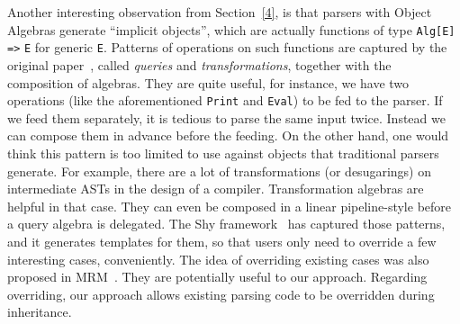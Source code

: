 \begin{comment}
Moreover, in~\cite{Oliveira:2012} the authors have discussed the
composition of algebras. In our parsing approach, a parser consumes an
algebra, which is delegated to return the results, during its process
of parsing. Having a set of algebras, it requires multiple parsing
with several times of invocation, which leads to redundant work.
Instead, algebras are supposed to be composed into one before the
invocation of the parser. Bahr et al. lead a similar discussion
in~\cite{Bahr2011}, where queries (or \textit{catamorphisms}) and
transformations (or \textit{homomorphisms}) are composable. They have
also mentioned the dual process of folds, namely
\textit{anamorphisms}. It is potentially related to our work, as
parsing is a representative kind of unfolds, whereas they only
discussed the composition of a cv-coalgebra and a term homomorphism,
which differs from modular parsing.
\end{comment}

Another interesting observation from Section~\ref{4}, is that parsers with
Object Algebras generate ``implicit objects'', which are actually functions of
type \lstinline{Alg[E]} \lstinline{=>} \lstinline{E} for generic \lstinline{E}.
Patterns of operations on such functions are captured by the original paper~\cite{Oliveira:2012}, called
\textit{queries} and \textit{transformations}, together with the composition of algebras.
They are quite useful, for instance, we have two operations (like the aforementioned \lstinline{Print} and \lstinline{Eval}) to be fed to the parser. If we feed them separately, it is tedious to parse the same input twice. Instead we can compose them in advance before the feeding. On the other hand, one would think this pattern is too limited to use against objects that traditional parsers generate. For example, there are a lot of transformations (or desugarings) on intermediate ASTs in the design of a compiler. Transformation algebras are helpful in that case. They can even be composed in a linear pipeline-style before a query algebra is delegated. The Shy framework~\cite{Zhang2015} has captured those patterns, and it generates templates for them, so that users only need to override a few interesting cases, conveniently. The idea of overriding existing cases was also
proposed in MRM~\cite{Oliveira2015}. They are potentially useful to our approach. Regarding overriding, our approach allows existing parsing code to be overridden during inheritance.
